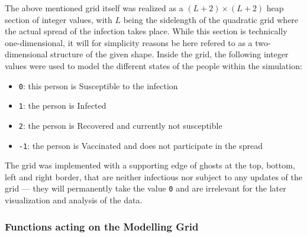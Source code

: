 The above mentioned grid itself was realized as a $\left(L+2\right)\times \left(L+2\right)$ heap section of integer values, with $L$ being the sidelength of the quadratic grid where the actual spread of the
infection takes place. While this section is technically one-dimensional, it will for simplicity reasons be here refered to as a two-dimensional structure of the given shape. 
Inside the grid, the following integer values were used to model the different states of the people within the simulation:
\begin{itemize}
    \item \texttt{0}: this person is Susceptible \susceptible{} to the infection
    \item \texttt{1}: the person is Infected \infected{}
    \item \texttt{2}: the person is Recovered \recovered{} and currently not susceptible
    \item \texttt{-1}: the person is Vaccinated \vaccinated{} and does not participate in the spread
\end{itemize}
The grid was implemented with a supporting edge of ghosts at the top, bottom, left and right border, that are neither infectious nor subject to any updates of the grid --- they will permanently take the value
\texttt{0} and are irrelevant for the later visualization and analysis of the data.


\subsubsection{Functions acting on the Modelling Grid}

